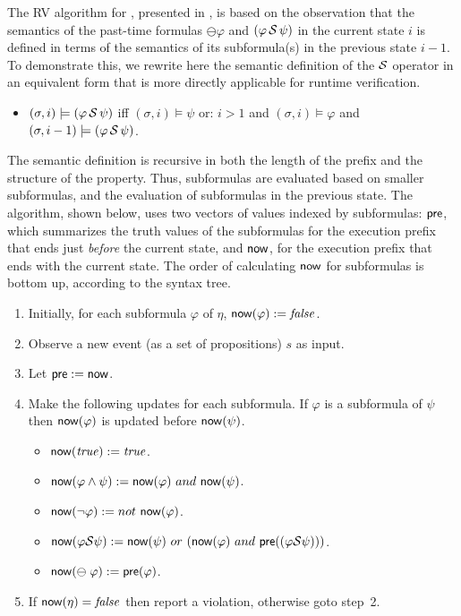 The RV algorithm for \PLTL{}, presented in \cite{HR},
is based on the observation that the semantics of the 
past-time formulas $\ominus \varphi$ and $(\varphi\, {\cal S} \,\psi)$ in the current state $i$ is defined in terms of the semantics of its subformula(s)
in the previous state $i - 1$.
To demonstrate this, we rewrite here the semantic definition of the 
 ${\cal S}$ operator in an equivalent form that is
more directly applicable for runtime verification.
\begin{itemize}
\item $(\sigma , i) \models (\varphi \, {\cal S} \, \psi)$ iff $(\sigma , i) \models \psi$ or: $i>1$ and
$( \sigma , i)  \models \varphi$ and 
$(\sigma , i-1 ) \models ( \varphi \, {\cal S} \, \psi )$.
\end{itemize}
The semantic definition is recursive in both the length of the prefix and the
structure of the property. Thus, subformulas
are evaluated based on smaller subformulas, and the
evaluation of subformulas in the previous state.
The algorithm, shown below, uses two vectors of values indexed by subformulas:  $\mathsf{pre}$, which summarizes the truth values of the
subformulas for the execution prefix that
ends just {\em before} the current state, and $\mathsf{now}$, for the execution prefix that
ends with the current state. The order of calculating $\mathsf{now}$ for subformulas is bottom up, according to the syntax tree.
\begin{enumerate}
\item Initially, for each subformula $\varphi$
of $\eta$,
$\mathsf{now} ( \varphi ) := \mathit{false}$.

\item Observe a new event (as a set of propositions) $s$ as input. 
\item Let $\mathsf{pre} := \mathsf{now}$.
\item Make the following updates for each subformula. If $\varphi$ is
      a subformula of $\psi$ then $\mathsf{now} ( \varphi )$ is updated before 
      $\mathsf{now} ( \psi )$.
\begin{itemize}
  \item $\mathsf{now} ( \mathit{true} ) := \mathit{true}$.
  \item $\mathsf{now} (  \varphi \wedge \psi  ) := 
  \mathsf{now} ( \varphi )\  and\ \mathsf{now} ( \psi )$.
  \item $\current ( \neg \varphi  ) := not\ \current ( \varphi )$.
  \item $\current (  \varphi \since \psi  ) :=  
  \current ( \psi  )\ or\ ( \current ( \varphi ) \ and\ 
      \old ( ( \varphi \since  \psi )))$.
  \item $\mathsf{now} ( \ominus \; \varphi ) := \mathsf{pre} ( \varphi )$.
\end{itemize}
\item If $\mathsf{now} (\eta) = \mathit{false}$ then
report a violation, otherwise goto step~2.
\end{enumerate}

